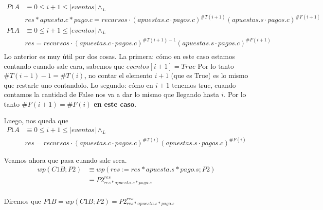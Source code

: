 \documentclass[../document.tex]{subfiles}
\begin{document}
\begin{equation} \label{eq2.a}
\begin{split}
P1A & \equiv 0\leq i+1 \leq |eventos| \land_L \\& res * apuesta.c * pago.c = recursos \cdot (apuestas.c\cdot pagos.c)^{\#T(i+1)}(apuestas.s\cdot pagos.c)^{\#F(i+1)}\\
P1A & \equiv 0\leq i+1 \leq |eventos| \land_L \\& res = recursos \cdot (apuestas.c\cdot pagos.c)^{\#T(i+1)-1}(apuestas.s\cdot pagos.c)^{\#F(i+1)}\\
\end{split}
\end{equation}
Lo anterior es muy útil por dos cosas.
La primera: cómo en este caso estamos contando cuando sale cara, sabemos que $eventos[i+1] = True$ Por lo tanto $\#T(i+1)-1=\#T(i)$, no contar el elemento $i+1$ (que es True) es lo mismo que restarle uno contandolo. Lo segundo: cómo en $i+1$ tenemos true, cuando contamos la cantidad de False nos va a dar lo mismo que llegando hasta $i$. Por lo tanto $\#F(i+1)=\#F(i)$ \textbf{en este caso}.

Luego, nos queda que
\begin{equation} 
    \begin{split}
    P1A & \equiv 0\leq i+1 \leq |eventos| \land_L \\& res = recursos \cdot (apuestas.c\cdot pagos.c)^{\#T(i)}(apuestas.s\cdot pagos.c)^{\#F(i)}
    \end{split}
\end{equation}

Veamos ahora que pasa cuando sale seca.
\begin{equation} \label{eq2.a}
\begin{split}
wp(C1B;P2) & \equiv wp(res := res * apuesta.s * pago.s; P2) \\
           & \equiv P2^{res}_{res * apuesta.s * pago.s} \\
\end{split}
\end{equation}

Diremos que $P1B = wp(C1B;P2) = P2^{res}_{res * apuesta.s * pago.s}$
\end{document}
